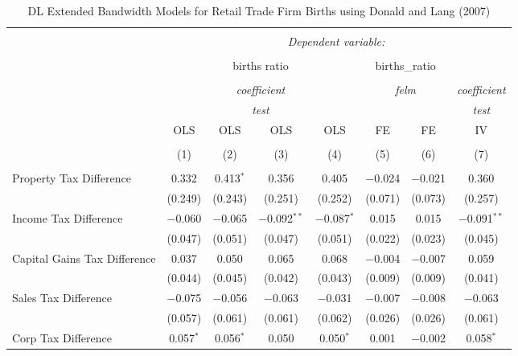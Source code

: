 
\begin{table}[!htbp] \centering 
  \caption{DL Extended Bandwidth Models for  Retail Trade Firm Births using Donald and Lang (2007)} 
  \label{} 
\begin{tabular}{@{\extracolsep{5pt}}lccccccc} 
\\[-1.8ex]\hline 
\hline \\[-1.8ex] 
 & \multicolumn{7}{c}{\textit{Dependent variable:}} \\ 
\cline{2-8} 
\\[-1.8ex] & \multicolumn{4}{c}{births ratio} & \multicolumn{2}{c}{births\_ratio} &   \\ 
\\[-1.8ex] & \multicolumn{4}{c}{\textit{coefficient}} & \multicolumn{2}{c}{\textit{felm}} & \textit{coefficient} \\ 
 & \multicolumn{4}{c}{\textit{test}} & \multicolumn{2}{c}{\textit{}} & \textit{test} \\ 
 & OLS & OLS & OLS & OLS & FE & FE & IV \\ 
\\[-1.8ex] & (1) & (2) & (3) & (4) & (5) & (6) & (7)\\ 
\hline \\[-1.8ex] 
 Property Tax Difference & 0.332 & 0.413$^{*}$ & 0.356 & 0.405 & $-$0.024 & $-$0.021 & 0.360 \\ 
  & (0.249) & (0.243) & (0.251) & (0.252) & (0.071) & (0.073) & (0.257) \\ 
  Income Tax Difference & $-$0.060 & $-$0.065 & $-$0.092$^{**}$ & $-$0.087$^{*}$ & 0.015 & 0.015 & $-$0.091$^{**}$ \\ 
  & (0.047) & (0.051) & (0.047) & (0.051) & (0.022) & (0.023) & (0.045) \\ 
  Capital Gains Tax Difference & 0.037 & 0.050 & 0.065 & 0.068 & $-$0.004 & $-$0.007 & 0.059 \\ 
  & (0.044) & (0.045) & (0.042) & (0.043) & (0.009) & (0.009) & (0.041) \\ 
  Sales Tax Difference & $-$0.075 & $-$0.056 & $-$0.063 & $-$0.031 & $-$0.007 & $-$0.008 & $-$0.063 \\ 
  & (0.057) & (0.061) & (0.061) & (0.062) & (0.026) & (0.026) & (0.061) \\ 
  Corp Tax Difference & 0.057$^{*}$ & 0.056$^{*}$ & 0.050 & 0.050$^{*}$ & 0.001 & $-$0.002 & 0.058$^{*}$ \\ 

\end{tabular}
\end{table}
